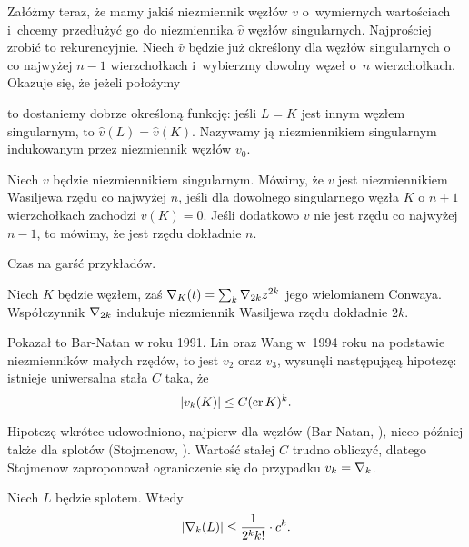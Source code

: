 Załóżmy teraz, że mamy jakiś niezmiennik węzłów $v$ o~wymiernych wartościach i~chcemy przedłużyć go do niezmiennika $\hat v$ węzłów singularnych.
Najprościej zrobić to rekurencyjnie.
Niech $\hat v$ będzie już określony dla węzłów singularnych o co najwyżej $n - 1$ wierzchołkach i~wybierzmy dowolny węzeł o~$n$ wierzchołkach.
Okazuje się, że jeżeli położymy
\begin{comment}
\begin{equation}
    \hat v(K) = \hat v(\LittleLeftCrossing) - \hat v(\LittleRightCrossing),
\end{equation}
\end{comment}
to dostaniemy dobrze określoną funkcję: jeśli $L = K$ jest innym węzłem singularnym, to $\hat v(L) = \hat v(K)$.
Nazywamy ją niezmiennikiem singularnym indukowanym przez niezmiennik węzłów $v_0$.

\begin{definition}
    \label{def:vassiliev_order}
    Niech $v$ będzie niezmiennikiem singularnym.
    Mówimy, że $v$ jest niezmiennikiem Wasiljewa rzędu co najwyżej $n$, jeśli dla dowolnego singularnego węzła $K$ o $n + 1$ wierzchołkach zachodzi $v(K) = 0$.
    Jeśli dodatkowo $v$ nie jest rzędu co najwyżej $n - 1$, to mówimy, że jest rzędu dokładnie $n$.
\end{definition}

Czas na garść przykładów.

\begin{example}
    Niech $K$ będzie węzłem, zaś $\nabla_K(t) = \sum_k \nabla_{2k} z^{2k}$ jego wielomianem Conwaya.
    Współczynnik $\nabla_{2k}$ indukuje niezmiennik Wasiljewa rzędu dokładnie $2k$.
\end{example}

Pokazał to Bar-Natan w roku 1991.
Lin oraz Wang w~1994 roku na podstawie niezmienników małych rzędów, to jest $v_2$ oraz $v_3$, wysunęli następującą hipotezę: istnieje uniwersalna stała $C$ taka, że
\begin{equation}
    |v_k(K)| \le C (\operatorname{cr} K)^k.
\end{equation}

Hipotezę wkrótce udowodniono, najpierw dla węzłów (Bar-Natan, \cite{barnatan95}), nieco później także dla splotów (Stojmenow, \cite{stoimenow_01}).
Wartość stałej $C$ trudno obliczyć, dlatego Stojmenow zaproponował ograniczenie się do przypadku $v_k = \nabla_k$.

\begin{conjecture}
    Niech $L$ będzie splotem.
    Wtedy
    \begin{equation}
        |\nabla_k(L)| \le \frac{1}{2^kk!} \cdot c^k.
    \end{equation}
\end{conjecture}

